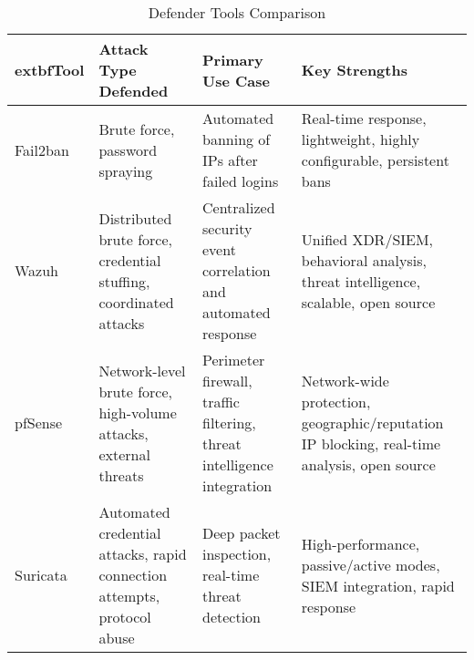 \begin{table}[h!]
\centering
\begin{tabularx}{\textwidth}{|>{\raggedright\arraybackslash}X|>{\raggedright\arraybackslash}X|>{\raggedright\arraybackslash}X|>{\raggedright\arraybackslash}X|}
\hline
	extbf{Tool} & \textbf{Attack Type Defended} & \textbf{Primary Use Case} & \textbf{Key Strengths} \\
\hline
Fail2ban & Brute force, password spraying & Automated banning of IPs after failed logins & Real-time response, lightweight, highly configurable, persistent bans \\
\hline
Wazuh & Distributed brute force, credential stuffing, coordinated attacks & Centralized security event correlation and automated response & Unified XDR/SIEM, behavioral analysis, threat intelligence, scalable, open source \\
\hline
pfSense & Network-level brute force, high-volume attacks, external threats & Perimeter firewall, traffic filtering, threat intelligence integration & Network-wide protection, geographic/reputation IP blocking, real-time analysis, open source \\
\hline
Suricata & Automated credential attacks, rapid connection attempts, protocol abuse & Deep packet inspection, real-time threat detection & High-performance, passive/active modes, SIEM integration, rapid response \\
\hline
\end{tabularx}
\caption{Defender Tools Comparison}
\label{tab:envtools}
\end{table}
